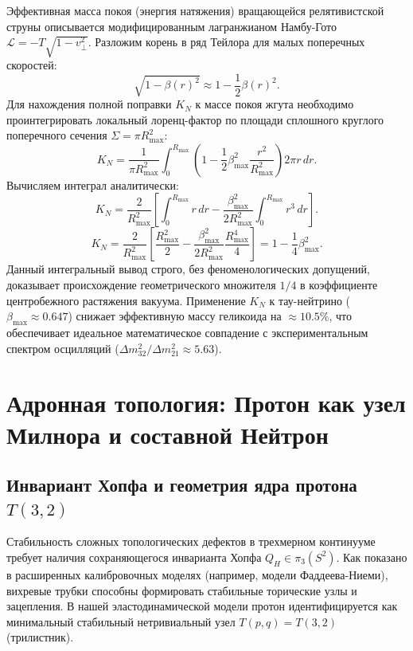 \documentclass[12pt,a4paper]{article}
\begin{document}
Эффективная масса покоя (энергия натяжения) вращающейся релятивистской струны описывается модифицированным лагранжианом Намбу-Гото $\mathcal{L} = -T \sqrt{1 - v_\perp^2}$. Разложим корень в ряд Тейлора для малых поперечных скоростей:
\begin{equation}
\sqrt{1 - \beta(r)^2} \approx 1 - \frac{1}{2} \beta(r)^2.
\end{equation}
Для нахождения полной поправки $K_N$ к массе покоя жгута необходимо проинтегрировать локальный лоренц-фактор по площади сплошного круглого поперечного сечения $\Sigma = \pi R_{\text{max}}^2$:
\begin{equation}
K_N = \frac{1}{\pi R_{\text{max}}^2} \int_0^{R_{\text{max}}} \left( 1 - \frac{1}{2} \beta_{\text{max}}^2 \frac{r^2}{R_{\text{max}}^2} \right) 2\pi r \, dr.
\end{equation}
Вычисляем интеграл аналитически:
\begin{equation}
K_N = \frac{2}{R_{\text{max}}^2} \left[ \int_0^{R_{\text{max}}} r \, dr - \frac{\beta_{\text{max}}^2}{2 R_{\text{max}}^2} \int_0^{R_{\text{max}}} r^3 \, dr \right].
\end{equation}
\begin{equation}
K_N = \frac{2}{R_{\text{max}}^2} \left[ \frac{R_{\text{max}}^2}{2} - \frac{\beta_{\text{max}}^2}{2 R_{\text{max}}^2} \frac{R_{\text{max}}^4}{4} \right] = 1 - \frac{1}{4} \beta_{\text{max}}^2.
\label{eq:k_factor}
\end{equation}
Данный интегральный вывод строго, без феноменологических допущений, доказывает происхождение геометрического множителя $1/4$ в коэффициенте центробежного растяжения вакуума. Применение $K_N$ к тау-нейтрино ($\beta_{\text{max}} \approx 0.647$) снижает эффективную массу геликоида на $\approx 10.5\%$, что обеспечивает идеальное математическое совпадение с экспериментальным спектром осцилляций ($\Delta m^2_{32} / \Delta m^2_{21} \approx 5.63$).

\section{Адронная топология: Протон как узел Милнора и составной Нейтрон}

\subsection{Инвариант Хопфа и геометрия ядра протона $T(3,2)$}
Стабильность сложных топологических дефектов в трехмерном континууме требует наличия сохраняющегося инварианта Хопфа $Q_H \in \pi_3(S^2)$. Как показано в расширенных калибровочных моделях (например, модели Фаддеева-Ниеми), вихревые трубки способны формировать стабильные торические узлы и зацепления.
В нашей эластодинамической модели протон идентифицируется как минимальный стабильный нетривиальный узел $T(p,q) = T(3,2)$ (трилистник). 
\end{document}
